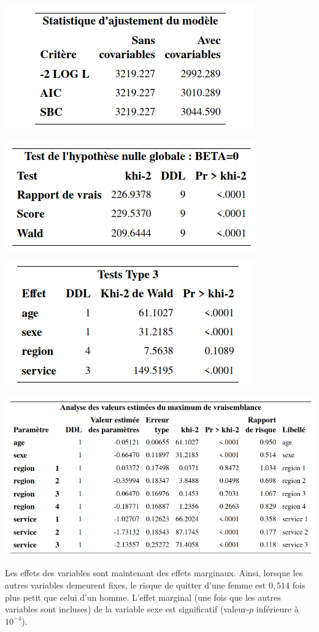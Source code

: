 \documentclass[
  11pt,
  letterpaper,
]{book}
\theoremstyle{definition}
\theoremstyle{definition}
\theoremstyle{definition}
\theoremstyle{remark}
\begin{document}
\begin{center}\includegraphics[width=0.45\linewidth]{figures/05-survie-e15} \end{center}

\begin{center}\includegraphics[width=0.45\linewidth]{figures/05-survie-e16} \end{center}

\begin{center}\includegraphics[width=0.45\linewidth]{figures/05-survie-e17} \end{center}

\begin{center}\includegraphics[width=0.85\linewidth]{figures/05-survie-e18} \end{center}

Les effets des variables sont maintenant des effets marginaux. Ainsi, lorsque les autres variables demeurent fixes, le risque de quitter d'une femme est \(0,514\) fois plus petit que celui d'un homme. L'effet marginal (une fois que les autres variables sont incluses) de la variable sexe est significatif (valeur-\(p\) inférieure à \(10^{-4}\)).
\end{document}
